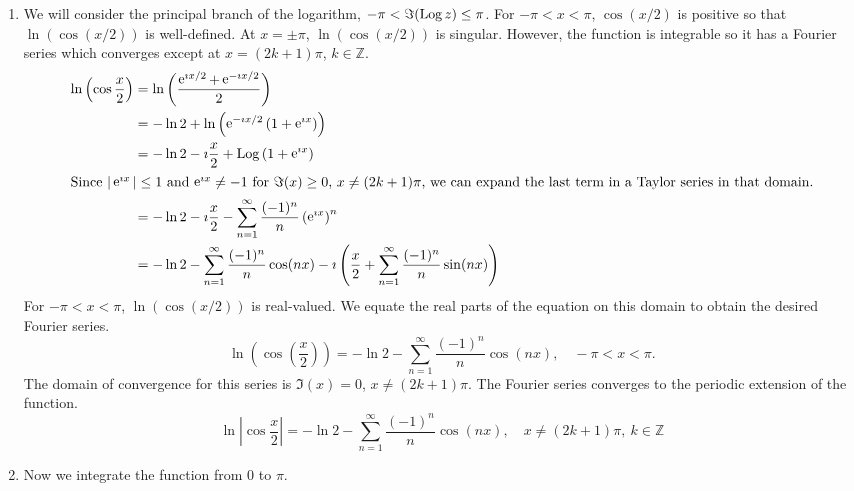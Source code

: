 {%
\begin{Solution}
  \begin{enumerate}
  \item
    We will consider the principal branch of the logarithm, 
    $-\pi < \Im(\mathop{\mathrm{Log}}\nolimits z) \leq \pi$.  For $-\pi < x < \pi$, $\cos(x/2)$ is 
    positive so that $\ln(\cos(x/2))$ is well-defined.  At $x = \pm \pi$,
    $\ln(\cos(x/2))$ is singular.  However, the function is integrable so
    it has a Fourier series which converges except at $x = (2 k + 1) \pi$, 
    $k \in \mathbb{Z}$.
    \begin{align*}
      \ln \left( \cos \frac{x}{2} \right)
      &= \ln \left( \frac{ \mathop{\mathrm{e}}\nolimits^{\imath x / 2} + \mathop{\mathrm{e}}\nolimits^{-\imath x / 2} }{ 2 } \right) 
      \\
      &= - \ln 2 + \ln \left( \mathop{\mathrm{e}}\nolimits^{-\imath x / 2} \left( 1 + \mathop{\mathrm{e}}\nolimits^{\imath x} \right)
      \right) 
      \\
      &= - \ln 2 - \imath \frac{x}{2} + \mathop{\mathrm{Log}}\nolimits \left( 1 + \mathop{\mathrm{e}}\nolimits^{\imath x} \right) 
      \\
      \intertext{Since $|\mathop{\mathrm{e}}\nolimits^{\imath x}| \leq 1$ and $\mathop{\mathrm{e}}\nolimits^{\imath x} \neq -1$ for 
        $\Im(x) \geq 0$, $x \neq (2 k + 1) \pi$, 
        we can expand the last term in a Taylor series in that domain.}
      &= - \ln 2 - \imath \frac{x}{2} - \sum_{n = 1}^\infty \frac{ (-1)^n }{ n } 
      \left( \mathop{\mathrm{e}}\nolimits^{\imath x} \right)^n 
      \\
      &= - \ln 2 - \sum_{n = 1}^\infty \frac{ (-1)^n }{ n } \cos(n x)
      - \imath \left( \frac{x}{2} + \sum_{n = 1}^\infty \frac{ (-1)^n }{ n } \sin(n x) \right) 
    \end{align*}
    For $-\pi < x < \pi$, $\ln(\cos(x/2))$ is real-valued.
    We equate the real parts of the equation on this domain to obtain the 
    desired Fourier series.
    \[
    \boxed{
      \ln \left( \cos \left( \frac{x}{2} \right) \right) = - \ln 2 
      - \sum_{n = 1}^\infty \frac{ (-1)^n }{ n } \cos(n x), \quad -\pi < x < \pi.
      }
    \]
    The domain of convergence for this series is $\Im(x) = 0$, $x \neq (2 k + 1) \pi$.
    The Fourier series converges to the periodic extension of the function.
    \[
    \boxed{
      \ln \left| \cos \frac{x}{2} \right| = - \ln 2 
      - \sum_{n = 1}^\infty \frac{ (-1)^n }{ n } \cos(n x), 
      \quad x \neq (2 k + 1) \pi,\ k \in \mathbb{Z}
      }
    \]
  \item
    Now we integrate the function from $0$ to $\pi$.
    \begin{align*}

\end{align*}
\end{enumerate}
\end{Solution}}
